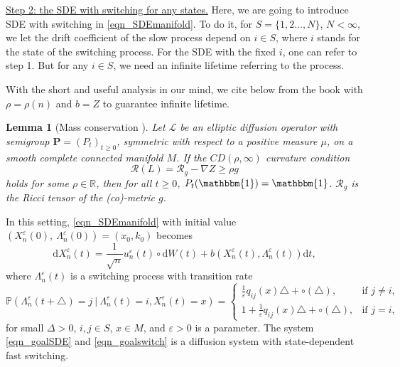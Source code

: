 \documentclass[a4paper]{article}
\newcommand{\bONE}{\mathbbm{1}}
\numberwithin{equation}{section}
\newtheorem{lemma}[theorem]{Lemma}
\theoremstyle{definition}
\begin{document}
	\underline{Step 2: the SDE with switching for any states.} 
	Here, we are going to introduce SDE with switching in \eqref{eqn_SDEmanifold}. To do it, for $S=\{1,2\ldots,N\}$, $N<\infty$, we let the drift coefficient of the slow process depend on $i\in S$, where $i$ stands for the state of the switching process. For the SDE with the fixed $i$, one can refer to step 1. But for any $i \in S$, we need an infinite lifetime referring to the process.
	\par
	With the short and useful analysis in our mind, we cite  below from the book \cite[Theorem 3.2.6]{BGL2014MR3155209} with $\rho=\rho(n)$ and $b=Z$ to guarantee infinite lifetime.
	\begin{lemma}[Mass conservation \cite{BGL2014MR3155209}]\label{lem_Mass_conservation}
		Let $\mathcal{L}$ be an elliptic diffusion operator with semigroup $\mathbf{P}=(P_t)_{t\geq 0}$, symmetric with respect to a positive measure $\mu$, on a smooth complete connected manifold $M$. If the $CD(\rho,\infty)$ curvature condition 
		\begin{equation*}
			\mathcal{R}(L)=\mathcal{R}_g-\nabla Z\geq \rho g
		\end{equation*}
		holds for some $\rho\in \mathbb{R}$, then for all $t\geq 0$, $P_t(\bONE)=\bONE$.
		$\mathcal{R}_g$ is the Ricci tensor of the (co)-metric $g$. 
	\end{lemma}
	
In this setting, \eqref{eqn_SDEmanifold} with initial value $(X^\varepsilon_n(0),~\Lambda^\varepsilon_n(0))=(x_0,k_0)$ becomes
\begin{equation}\label{eqn_goalSDE}
	\mathrm{d}X^\varepsilon_n(t)=\frac{1}{\sqrt{n}}u^\varepsilon_n(t) \circ\mathrm{d}W(t)+b(X^\varepsilon_n(t),\Lambda^\varepsilon_n(t))\mathrm{d}t,
\end{equation}
where $\Lambda_n^\varepsilon(t)$ is a switching process with transition rate 
\begin{equation}\label{eqn_goalswitch}
	\mathbb{P} (\Lambda^{\varepsilon}_n(t+\triangle)=j~|~\Lambda^{\varepsilon}_n(t)=i, X^{\varepsilon}_n(t)= x)=
	\begin{cases}
		\frac{1}{\varepsilon}q_{ij}(x)\triangle+ \circ(\triangle) ,&\mbox{if $j\neq i$,}\\
		1+\frac{1}{\varepsilon}q_{ij}(x)\triangle +\circ(\triangle),&\mbox{if $j=i$,}
	\end{cases}
\end{equation}
for small $\Delta >0$, $i,j \in S$, $x\in M$, and $\varepsilon>0$ is a parameter. The system 
\eqref{eqn_goalSDE} and \eqref{eqn_goalswitch} is a diffusion system with state-dependent fast switching.
\end{document}
